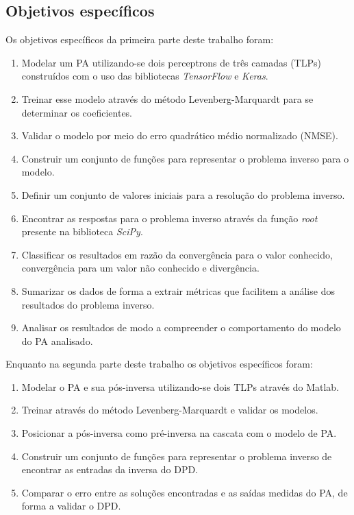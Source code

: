 \subsection{Objetivos específicos} \label{ssec:introd-obje-espec}
Os objetivos específicos da primeira parte deste trabalho foram:

\begin{enumerate}
    \item Modelar um PA utilizando-se dois perceptrons de três camadas (TLPs) construídos com o uso das bibliotecas \textit{TensorFlow} e \textit{Keras}.
    \item Treinar esse modelo através do método Levenberg-Marquardt para se determinar os coeficientes.
    \item Validar o modelo por meio do erro quadrático médio normalizado (NMSE).
    \item Construir um conjunto de funções para representar o problema inverso para o modelo.
    \item Definir um conjunto de valores iniciais para a resolução do problema inverso.
    \item Encontrar as respostas para o problema inverso através da função \textit{root} presente na biblioteca \textit{SciPy}.
    \item Classificar os resultados em razão da convergência para o valor conhecido, convergência para um valor não conhecido e divergência.
    \item Sumarizar os dados de forma a extrair métricas que facilitem a análise dos resultados do problema inverso.
    \item Analisar os resultados de modo a compreender o comportamento do modelo do PA analisado.
\end{enumerate}

Enquanto na segunda parte deste trabalho os objetivos específicos foram:

\begin{enumerate}
    \item Modelar o PA e sua pós-inversa utilizando-se dois TLPs através do Matlab.
    \item Treinar através do método Levenberg-Marquardt e validar os modelos.
    \item Posicionar a pós-inversa como pré-inversa na cascata com o modelo de PA.
    \item Construir um conjunto de funções para representar o problema inverso de encontrar as entradas da inversa do DPD.
    \item Comparar o erro entre as soluções encontradas e as saídas medidas do PA, de forma a validar o DPD.
\end{enumerate}

